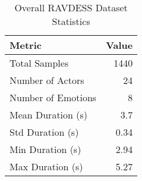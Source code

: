 \begin{table}[h]
\centering
\caption{Overall RAVDESS Dataset Statistics}
\begin{tabular}{lr}
\hline
 Metric             &   Value \\
\hline
 Total Samples      & 1440    \\
 Number of Actors   &   24    \\
 Number of Emotions &    8    \\
 Mean Duration (s)  &    3.7  \\
 Std Duration (s)   &    0.34 \\
 Min Duration (s)   &    2.94 \\
 Max Duration (s)   &    5.27 \\
\hline
\end{tabular}
\end{table}
